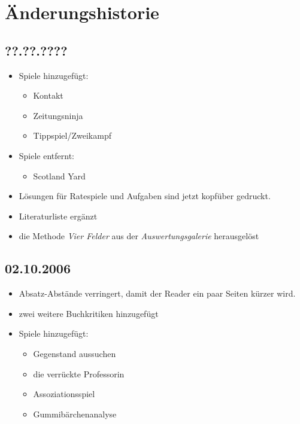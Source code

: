 \chapter{Änderungshistorie}
\section*{??.??.????}
\begin{itemize}
  \item Spiele hinzugefügt:
    \begin{itemize}
      \item Kontakt
      \item Zeitungsninja
      \item Tippspiel/Zweikampf
    \end{itemize}
  \item Spiele entfernt:
    \begin{itemize}
      \item Scotland Yard
    \end{itemize}
  \item Lösungen für Ratespiele und Aufgaben sind jetzt kopfüber gedruckt.
  \item Literaturliste ergänzt
  \item die Methode \emph{Vier Felder} aus der \emph{Auswertungsgalerie} herausgelöst
\end{itemize}


\section*{02.10.2006}
\begin{itemize}
  \item Absatz-Abstände verringert, damit der Reader ein paar Seiten kürzer wird.
  \item zwei weitere Buchkritiken hinzugefügt
  \item Spiele hinzugefügt:
  \begin{itemize}
    \item Gegenstand aussuchen
    \item die verrückte Professorin
    \item Assoziationsspiel
    \item Gummibärchenanalyse
  \end{itemize}
\end{itemize}



